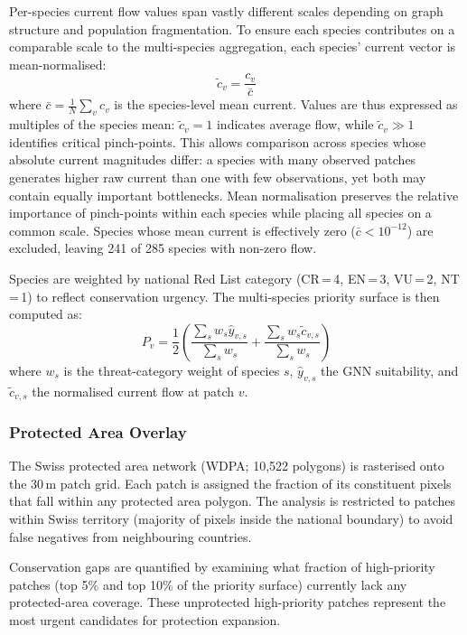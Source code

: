Per-species current flow values span vastly different scales
depending on graph structure and population fragmentation. To
ensure each species contributes on a comparable scale to the
multi-species aggregation, each species' current vector is
mean-normalised:
\begin{equation}
    \tilde{c}_{v} = \frac{c_v}{\bar{c}}
    \label{eq:normalisation}
\end{equation}
where $\bar{c} = \frac{1}{N}\sum_{v} c_v$ is the species-level
mean current. Values are thus expressed as multiples of the
species mean: $\tilde{c}_v = 1$ indicates average flow, while
$\tilde{c}_v \gg 1$ identifies critical pinch-points. This
allows comparison across species whose absolute current
magnitudes differ: a species with many observed
patches generates higher raw current than one with few
observations, yet both may contain equally important
bottlenecks. Mean normalisation preserves the relative
importance of pinch-points within each species while placing
all species on a common scale. Species whose mean current is
effectively zero ($\bar{c} < 10^{-12}$) are excluded, leaving
241 of 285 species with non-zero flow.

Species are weighted by national Red List category
(CR\,=\,4, EN\,=\,3, VU\,=\,2, NT\,=\,1) to reflect
conservation urgency. The multi-species priority surface
is then computed as:
\begin{equation}
    P_v = \frac{1}{2}\left( 
        \frac{\sum_s w_s \hat{y}_{v,s}}{\sum_s w_s} + 
        \frac{\sum_s w_s \tilde{c}_{v,s}}{\sum_s w_s} 
    \right)
    \label{eq:priority}
\end{equation}
where $w_s$ is the threat-category weight of species $s$,
$\hat{y}_{v,s}$ the GNN suitability, and $\tilde{c}_{v,s}$
the normalised current flow at patch $v$.

\subsubsection{Protected Area Overlay}
\label{sec:overlay}

The Swiss protected area network (WDPA; 10,522 polygons) is rasterised onto 
the 30\,m patch grid. Each patch is assigned the fraction of its constituent 
pixels that fall within any protected area polygon. The analysis is restricted 
to patches within Swiss territory (majority of pixels inside the national 
boundary) to avoid false negatives from neighbouring countries.

Conservation gaps are quantified by examining what fraction of high-priority 
patches (top 5\% and top 10\% of the priority surface) currently lack any 
protected-area coverage. These unprotected high-priority patches represent 
the most urgent candidates for protection expansion.
